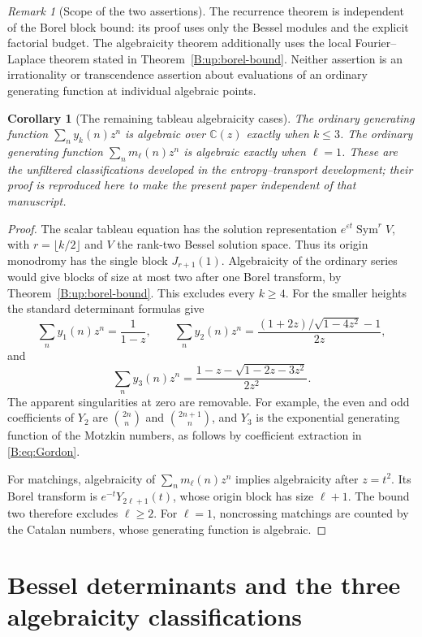 \documentclass[11pt,a4paper]{article}
\newtheorem{corollary}[theorem]{Corollary}
\theoremstyle{definition}
\theoremstyle{remark}
\newtheorem{remark}[theorem]{Remark}
\newcommand{\C}{\mathbb C}
\numberwithin{equation}{section}
\begin{document}
\begin{remark}[Scope of the two assertions]
The recurrence theorem is independent of the Borel block bound:
its proof uses only the Bessel modules and the explicit
factorial budget.  The algebraicity theorem additionally uses
the local Fourier--Laplace theorem stated in
Theorem~\ref{B:up:borel-bound}.  Neither assertion is an
irrationality or transcendence assertion about evaluations
of an ordinary generating function at individual algebraic
points.
\end{remark}


\begin{corollary}[The remaining tableau algebraicity cases]
\label{B:up:three-algebraicity}
The ordinary generating function $\sum_ny_k(n)z^n$ is algebraic
over $\C(z)$ exactly when $k\le3$. The ordinary generating
function $\sum_nm_\ell(n)z^n$ is algebraic exactly when $\ell=1$.
These are the unfiltered classifications developed in the entropy--transport development; their proof is reproduced here to make
the present paper independent of that manuscript.
\end{corollary}
\begin{proof}
The scalar tableau equation has the solution representation
$e^{\varepsilon t}\operatorname{Sym}^r V$, with
$r=\lfloor k/2\rfloor$ and $V$ the rank-two Bessel solution
space. Thus its origin monodromy has the single block
$J_{r+1}(1)$. Algebraicity of the ordinary series would give
blocks of size at most two after one Borel transform, by
Theorem~\ref{B:up:borel-bound}. This excludes every $k\ge4$.
For the smaller heights the standard determinant formulas give
\[
 \sum_ny_1(n)z^n=\frac1{1-z},\qquad
 \sum_ny_2(n)z^n=
 \frac{(1+2z)/\sqrt{1-4z^2}-1}{2z},
\]
and
\[
 \sum_ny_3(n)z^n=
       \frac{1-z-\sqrt{1-2z-3z^2}}{2z^2}.
\]
The apparent singularities at zero are removable. For example,
the even and odd coefficients of $Y_2$ are
$\binom{2n}{n}$ and $\binom{2n+1}{n}$, and $Y_3$ is the
exponential generating function of the Motzkin numbers, as follows
by coefficient extraction in \eqref{B:eq:Gordon}.

For matchings, algebraicity of $\sum_nm_\ell(n)z^n$ implies
algebraicity after $z=t^2$. Its Borel transform is
$e^{-t}Y_{2\ell+1}(t)$, whose origin block has size
$\ell+1$. The bound two therefore excludes $\ell\ge2$.
For $\ell=1$, noncrossing matchings are counted by the Catalan
numbers, whose generating function is algebraic.
\end{proof}

\section{Bessel determinants and the three algebraicity classifications}
\label{E:sfb:section}
\end{document}
